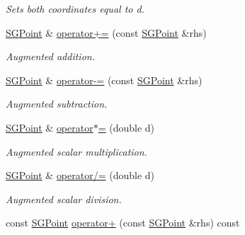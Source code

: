 \begin{DoxyCompactItemize}
\begin{DoxyCompactList}\small\item\em Sets both coordinates equal to d. \end{DoxyCompactList}\item 
\hypertarget{classSGPoint_a65eb9c1b564b55fadcae4e5a0b75c7a4}{\hyperlink{classSGPoint}{S\-G\-Point} \& \hyperlink{classSGPoint_a65eb9c1b564b55fadcae4e5a0b75c7a4}{operator+=} (const \hyperlink{classSGPoint}{S\-G\-Point} \&rhs)}\label{classSGPoint_a65eb9c1b564b55fadcae4e5a0b75c7a4}

\begin{DoxyCompactList}\small\item\em Augmented addition. \end{DoxyCompactList}\item 
\hypertarget{classSGPoint_aef6456278892c01cd4ef0881f10d2082}{\hyperlink{classSGPoint}{S\-G\-Point} \& \hyperlink{classSGPoint_aef6456278892c01cd4ef0881f10d2082}{operator-\/=} (const \hyperlink{classSGPoint}{S\-G\-Point} \&rhs)}\label{classSGPoint_aef6456278892c01cd4ef0881f10d2082}

\begin{DoxyCompactList}\small\item\em Augmented subtraction. \end{DoxyCompactList}\item 
\hypertarget{classSGPoint_a2d16a99bae47723ddb8eb0257254bf9e}{\hyperlink{classSGPoint}{S\-G\-Point} \& \hyperlink{classSGPoint_a2d16a99bae47723ddb8eb0257254bf9e}{operator$\ast$=} (double d)}\label{classSGPoint_a2d16a99bae47723ddb8eb0257254bf9e}

\begin{DoxyCompactList}\small\item\em Augmented scalar multiplication. \end{DoxyCompactList}\item 
\hypertarget{classSGPoint_acd23eead6f4b4240d532beaf1dfff30d}{\hyperlink{classSGPoint}{S\-G\-Point} \& \hyperlink{classSGPoint_acd23eead6f4b4240d532beaf1dfff30d}{operator/=} (double d)}\label{classSGPoint_acd23eead6f4b4240d532beaf1dfff30d}

\begin{DoxyCompactList}\small\item\em Augmented scalar division. \end{DoxyCompactList}\item 
\hypertarget{classSGPoint_ac65eeaae1fde02ace32a892ad4aeb772}{const \hyperlink{classSGPoint}{S\-G\-Point} \hyperlink{classSGPoint_ac65eeaae1fde02ace32a892ad4aeb772}{operator+} (const \hyperlink{classSGPoint}{S\-G\-Point} \&rhs) const }\label{classSGPoint_ac65eeaae1fde02ace32a892ad4aeb772}


\end{DoxyCompactItemize}
